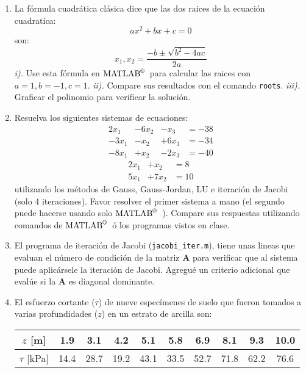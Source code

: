 \documentclass[letterpaper,12pt]{exam}
\newcommand{\matlab}{$\text{MATLAB}^{\text{\textregistered}}$~}
\begin{document}
\begin{enumerate}
 \item La fórmula cuadrática clásica dice que las dos raices de la ecuación cuadratica:
  \begin{equation}
   ax^2 + bx + c = 0
  \end{equation}
 son: 
  \begin{equation}
   x_1, x_2 = \frac{-b \pm \sqrt{b^2-4ac}}{2a}
  \end{equation}
 \emph{i).} Use esta fórmula en \matlab para calcular las raices con $a=1,b=-1,c=1$. \emph{ii).} Compare sus resultados con el comando \texttt{roots}. \emph{iii).} Graficar el polinomio para verificar la solución.

 \item  Resuelva los siguientes sistemas de ecuaciones:
  \begin{equation}
   \begin{matrix}
    2x_1 &− 6x_2 &− x_3  &= −38 \\
   −3x_1 &− x_2  &+ 6x_3 &= −34 \\
   −8x_1 &+ x_2  &− 2x_3 &= −40
   \end{matrix}
  \end{equation}
  \begin{equation}
   \begin{matrix}
    2x_1 &+ x_2 &= 8 \\
    5x_1 &+ 7x_2 &=10
   \end{matrix}
  \end{equation}
 utilizando los métodos de Gauss, Gauss-Jordan, LU e iteración de Jacobi (solo 4 iteraciones). Favor resolver el primer sistema a mano (el segundo puede hacerse usando solo \matlab). Compare sus respuestas utilizando comandos de \matlab ó los programas vistos en clase.

 
 \item El programa de iteración de Jacobi (\texttt{jacobi\_iter.m}), tiene unas lineas que evaluan el número de condición de la matriz $\mathbf{A}$ para verificar que al sistema puede aplicársele la iteración de Jacobi. Agregué un criterio adicional que evalúe si la $\mathbf{A}$ es diagonal dominante.

 \item El esfuerzo cortante ($\tau$) de nueve especímenes de suelo que fueron tomados a varias profundidades ($z$) en un estrato de arcilla son:
 \begin{table}[h!]
  \centering
  \begin{tabular}{c|ccccccccc}
   $z$ [m]      & 1.9  & 3.1  & 4.2  & 5.1  & 5.8  & 6.9  & 8.1  & 9.3  & 10.0 \\
   \hline
   $\tau$ [kPa] & 14.4 & 28.7 & 19.2 & 43.1 & 33.5 & 52.7 & 71.8 & 62.2 & 76.6
  \end{tabular}
 \end{table}


\end{enumerate}
\end{document}
